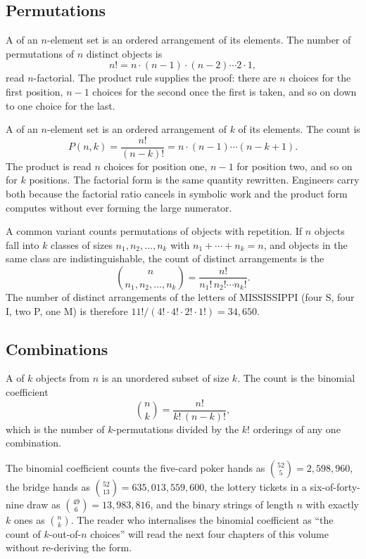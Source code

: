 \subsection{Permutations}

A  of an $n$-element set is an ordered
arrangement of its elements. The number of permutations of $n$
distinct objects is
\[
n! = n \cdot (n-1) \cdot (n-2) \cdots 2 \cdot 1,
\]
read $n$-factorial. The product rule supplies the proof: there are
$n$ choices for the first position, $n-1$ choices for the second
once the first is taken, and so on down to one choice for the last.

A  of an $n$-element set is an ordered
arrangement of $k$ of its elements. The count is
\[
P(n, k) = \frac{n!}{(n-k)!} = n \cdot (n-1) \cdots (n-k+1).
\]
The product is read $n$ choices for position one, $n-1$ for position
two, and so on for $k$ positions. The factorial form is the same
quantity rewritten. Engineers carry both because the factorial
ratio cancels in symbolic work and the product form computes
without ever forming the large numerator.

A common variant counts permutations of objects with repetition. If
$n$ objects fall into $k$ classes of sizes $n_{1}, n_{2}, \ldots,
n_{k}$ with $n_{1} + \cdots + n_{k} = n$, and objects in the same
class are indistinguishable, the count of distinct arrangements is
the 
\[
\binom{n}{n_{1}, n_{2}, \ldots, n_{k}} =
\frac{n!}{n_{1}!\, n_{2}! \cdots n_{k}!}.
\]
The number of distinct arrangements of the letters of MISSISSIPPI
(four S, four I, two P, one M) is therefore $11! / (4! \cdot 4!
\cdot 2! \cdot 1!) = 34{,}650$.

\subsection{Combinations}

A  of $k$ objects from $n$ is an unordered
subset of size $k$. The count is the binomial coefficient
\[
\binom{n}{k} = \frac{n!}{k!\,(n-k)!},
\]
which is the number of $k$-permutations divided by the $k!$
orderings of any one combination.

The binomial coefficient counts the five-card poker hands as
$\binom{52}{5} = 2{,}598{,}960$, the bridge hands as $\binom{52}{13}
= 635{,}013{,}559{,}600$, the lottery tickets in a six-of-forty-nine
draw as $\binom{49}{6} = 13{,}983{,}816$, and the binary strings of
length $n$ with exactly $k$ ones as $\binom{n}{k}$. The reader who
internalises the binomial coefficient as ``the count of $k$-out-of-$n$
choices'' will read the next four chapters of this volume without
re-deriving the form.

